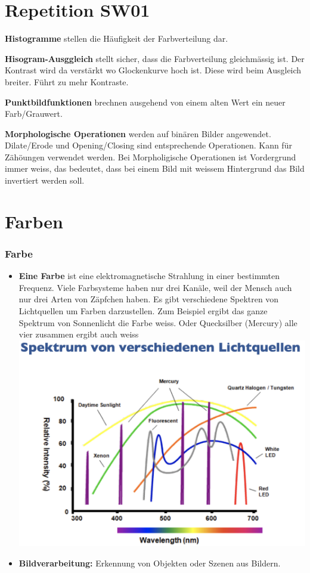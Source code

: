 \section{Repetition SW01}
\itemsep0pt
\item \textbf{Histogramme} stellen die Häufigkeit der Farbverteilung dar.
\item \textbf{Hisogram-Ausggleich} stellt sicher, dass die Farbverteilung gleichmässig ist. Der Kontrast wird da verstärkt wo Glockenkurve hoch ist. Diese wird beim Ausgleich breiter. Führt zu mehr Kontraste.
\item \textbf{Punktbildfunktionen} brechnen ausgehend von einem alten Wert ein neuer Farb/Grauwert.
\item \textbf{Morphologische Operationen} werden auf binären Bilder angewendet. 
Dilate/Erode und Opening/Closing sind entsprechende Operationen. Kann für Zähöungen verwendet werden. Bei Morpholigische Operationen ist Vordergrund immer weiss, das bedeutet, dass bei einem Bild mit weissem Hintergrund das Bild invertiert werden soll.
\section{Farben}


\subsubsection{Farbe}
\begin{itemize}
	\itemsep0pt
	\item \textbf{Eine Farbe} ist eine elektromagnetische Strahlung in einer bestimmten Frequenz. Viele Farbsysteme haben nur drei Kanäle, weil der Mensch auch nur drei Arten von Zäpfchen haben. Es gibt verschiedene Spektren von Lichtquellen um Farben darzustellen. Zum Beispiel ergibt das ganze Spektrum von Sonnenlicht die Farbe weiss. Oder Quecksilber (Mercury) alle vier zusammen ergibt auch weiss
\includegraphics{images/sw02/spektrum-lichtquellen.png} 
	\item \textbf{Bildverarbeitung:} Erkennung von Objekten oder Szenen aus Bildern.
\end{itemize}

